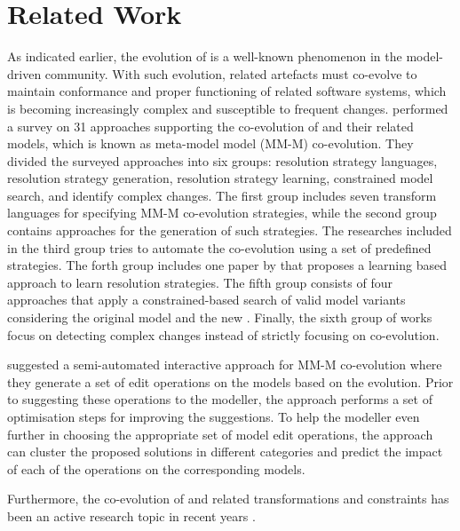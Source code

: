 \section{Related Work} \label{sec:RW}

As indicated earlier, the evolution of \metamodels is a well-known phenomenon in the model-driven community. With such evolution, related artefacts must co-evolve to maintain conformance and proper functioning of related software systems, which is becoming increasingly complex and susceptible to frequent changes. \Textcite{Hebig2017} performed a survey on 31 approaches supporting the co-evolution of \metamodels and their related models, which is known as meta-model model (MM-M) co-evolution. They divided the surveyed approaches into six groups: resolution strategy languages, resolution strategy generation, resolution strategy learning, constrained model search, and identify complex changes. The first group includes seven transform languages for specifying MM-M co-evolution strategies, while the second group contains approaches for the generation of such strategies. The researches included in the third group tries to automate the co-evolution using a set of predefined strategies. The forth group includes one paper by \textcite{Anguel2013} that proposes a learning based approach to learn resolution strategies. The fifth group consists of four approaches that apply a constrained-based search of valid model variants considering the original model and the new \metamodel. Finally, the sixth group of works focus on detecting complex \metamodel changes instead of strictly focusing on co-evolution.

\Textcite{Kessentini2022} suggested a semi-automated interactive approach for MM-M co-evolution where they generate a set of edit operations on the models based on the \metamodel evolution. Prior to suggesting these operations to the modeller, the approach performs a set of optimisation steps for improving the suggestions. To help the modeller even further in choosing the appropriate set of model edit operations, the approach can cluster the proposed solutions in different categories and predict the impact of each of the operations on the corresponding models.

Furthermore, the co-evolution of \metamodel and related transformations and constraints has been an active research topic in recent years \cite{Kusel2015, Khelladi2017, garcia2013}.


